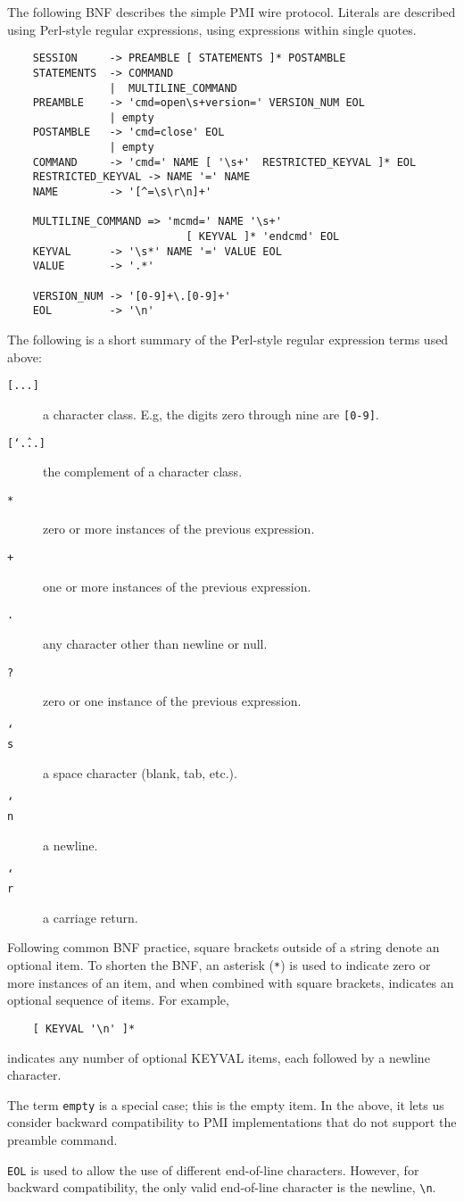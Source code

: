 \documentclass{article}
\begin{document}
The following BNF describes the simple PMI wire protocol.  Literals are 
described using Perl-style regular expressions, using expressions within single
quotes.
\begin{verbatim}
    SESSION     -> PREAMBLE [ STATEMENTS ]* POSTAMBLE
    STATEMENTS  -> COMMAND
                |  MULTILINE_COMMAND
    PREAMBLE    -> 'cmd=open\s+version=' VERSION_NUM EOL
                | empty
    POSTAMBLE   -> 'cmd=close' EOL
                | empty
    COMMAND     -> 'cmd=' NAME [ '\s+'  RESTRICTED_KEYVAL ]* EOL
    RESTRICTED_KEYVAL -> NAME '=' NAME
    NAME        -> '[^=\s\r\n]+'
    
    MULTILINE_COMMAND => 'mcmd=' NAME '\s+' 
                            [ KEYVAL ]* 'endcmd' EOL
    KEYVAL      -> '\s*' NAME '=' VALUE EOL
    VALUE       -> '.*'

    VERSION_NUM -> '[0-9]+\.[0-9]+'
    EOL         -> '\n'
\end{verbatim}
The following is a short summary of the Perl-style regular expression
terms used above:
\begin{description}
\item[\texttt{[...]}]a character class.  E.g, the digits zero through
 nine are \texttt{[0-9]}.
\item[\texttt{[\char`\^...]}]the complement of a character class.
\item[\texttt{*}]zero or more instances of the previous expression.
\item[\texttt{+}]one or more instances of the previous expression.
\item[\texttt{.}]any character other than newline or null.
\item[\texttt{?}]zero or one instance of the previous expression.
\item[\texttt{\char`\\s}]a space character (blank, tab, etc.).
\item[\texttt{\char`\\n}]a newline.
\item[\texttt{\char`\\r}]a carriage return.
\end{description}
Following common BNF practice, square brackets outside of a string
denote an optional item.  To shorten the BNF, an asterisk (\texttt{*})
is used to indicate zero or more instances of an item, and when
combined with square brackets, indicates an optional sequence of
items.  For example, 
\begin{verbatim}
    [ KEYVAL '\n' ]*
\end{verbatim}
indicates any number of optional KEYVAL items, each followed by a
newline character.

The term \texttt{empty} is a special case; this is the empty item.  In
the above, it lets us consider backward compatibility to PMI
implementations that do not support the preamble command.

\texttt{EOL} is used to allow the use of different end-of-line characters.
However, for backward compatibility, the only valid end-of-line character is
the newline, {\tt\verb+\n+}.
\end{document}
